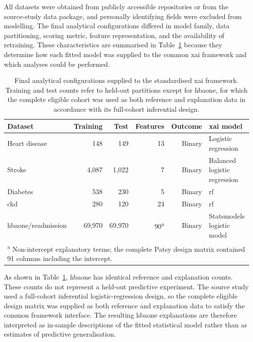 All datasets were obtained from publicly accessible repositories or from the source-study data package, and personally identifying fields were excluded from modelling. The final analytical configurations differed in model family, data partitioning, scoring metric, feature representation, and the availability of retraining. These characteristics are summarised in Table~\ref{tab:final-configurations} because they determine how each fitted model was supplied to the common \gls{xai} framework and which analyses could be performed.

\begin{table}[htbp]
    \centering
    \caption{Final analytical configurations supplied to the standardised \gls{xai} framework. Training and test counts refer to held-out partitions except for \gls{hbaone}, for which the complete eligible cohort was used as both reference and explanation data in accordance with its full-cohort inferential design.}
    \label{tab:final-configurations}
    \begin{tabular}{lrrrrl}
        \hline
        Dataset & Training & Test & Features & Outcome & \gls{xai} model \\
        \hline
        Heart disease & 148 & 149 & 13 & Binary & Logistic regression \\
        Stroke & 4,087 & 1,022 & 7 & Binary & Balanced logistic regression \\
        Diabetes & 538 & 230 & 5 & Binary & \Gls{rf} \\
        \gls{ckd} & 280 & 120 & 24 & Binary & \Gls{rf} \\
        \gls{hbaone}/readmission & 69,970 & 69,970 & 90\textsuperscript{a}
            & Binary & Statsmodels logistic model \\
        \multicolumn{6}{l}{\footnotesize
        \textsuperscript{a} Non-intercept explanatory terms; the complete
        Patsy design matrix contained 91 columns including the intercept.} \\
        \hline
    \end{tabular}
\end{table}

As shown in Table~\ref{tab:final-configurations}, \gls{hbaone} has identical reference and explanation counts. These counts do not represent a held-out predictive experiment. The source study used a full-cohort inferential logistic-regression design, so the complete eligible design matrix was supplied as both reference and explanation data to satisfy the common framework interface. The resulting \gls{hbaone} explanations are therefore interpreted as in-sample descriptions of the fitted statistical model rather than as estimates of predictive generalisation.


